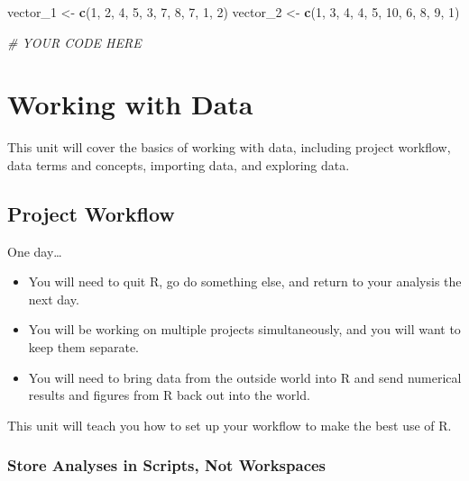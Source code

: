 \documentclass[]{book}
\newenvironment{Shaded}{\begin{snugshade}}{\end{snugshade}}
\newcommand{\KeywordTok}[1]{\textcolor[rgb]{0.13,0.29,0.53}{\textbf{#1}}}
\newcommand{\DecValTok}[1]{\textcolor[rgb]{0.00,0.00,0.81}{#1}}
\newcommand{\StringTok}[1]{\textcolor[rgb]{0.31,0.60,0.02}{#1}}
\newcommand{\CommentTok}[1]{\textcolor[rgb]{0.56,0.35,0.01}{\textit{#1}}}
\newcommand{\NormalTok}[1]{#1}
\providecommand{\tightlist}{%
  \setlength{\itemsep}{0pt}\setlength{\parskip}{0pt}}
\begin{document}
\begin{Shaded}
\begin{Highlighting}[]
\NormalTok{vector_}\DecValTok{1}\NormalTok{ <-}\StringTok{ }\KeywordTok{c}\NormalTok{(}\DecValTok{1}\NormalTok{, }\DecValTok{2}\NormalTok{, }\DecValTok{4}\NormalTok{, }\DecValTok{5}\NormalTok{, }\DecValTok{3}\NormalTok{, }\DecValTok{7}\NormalTok{, }\DecValTok{8}\NormalTok{, }\DecValTok{7}\NormalTok{, }\DecValTok{1}\NormalTok{, }\DecValTok{2}\NormalTok{)}
\NormalTok{vector_}\DecValTok{2}\NormalTok{ <-}\StringTok{ }\KeywordTok{c}\NormalTok{(}\DecValTok{1}\NormalTok{, }\DecValTok{3}\NormalTok{, }\DecValTok{4}\NormalTok{, }\DecValTok{4}\NormalTok{, }\DecValTok{5}\NormalTok{, }\DecValTok{10}\NormalTok{, }\DecValTok{6}\NormalTok{, }\DecValTok{8}\NormalTok{, }\DecValTok{9}\NormalTok{, }\DecValTok{1}\NormalTok{)}

\CommentTok{# YOUR CODE HERE}
\end{Highlighting}
\end{Shaded}

\chapter{Working with Data}\label{working-with-data}

This unit will cover the basics of working with data, including project
workflow, data terms and concepts, importing data, and exploring data.

\section{Project Workflow}\label{project-workflow}

One day\ldots{}

\begin{itemize}
\tightlist
\item
  You will need to quit R, go do something else, and return to your
  analysis the next day.
\item
  You will be working on multiple projects simultaneously, and you will
  want to keep them separate.
\item
  You will need to bring data from the outside world into R and send
  numerical results and figures from R back out into the world.
\end{itemize}

This unit will teach you how to set up your workflow to make the best
use of R.

\subsection{Store Analyses in Scripts, Not
Workspaces}\label{store-analyses-in-scripts-not-workspaces}
\end{document}
